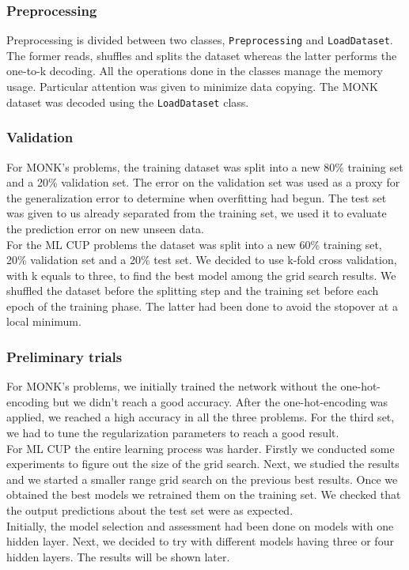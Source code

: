 \subsubsection{Preprocessing}
Preprocessing is divided between two classes, \texttt{Preprocessing} and \texttt{LoadDataset}. The former reads, shuffles and splits the dataset whereas the latter performs the one-to-k decoding. All the operations done in the classes manage the memory usage. Particular attention was given to minimize data copying. The MONK dataset was decoded using the \texttt{LoadDataset} class.

\subsubsection{Validation}
For MONK's problems, the training dataset was split into a new 80\% training set and a 20\% validation set. The error on the validation set was used as a proxy for the generalization error to determine when overfitting had begun. The test set was given to us already separated from the training set, we used it to evaluate the prediction error on new unseen data. 
\\
For the ML CUP problems the dataset was split into a new 60\% training set, 20\% validation set and a 20\% test set. We decided to use k-fold cross validation, with k equals to three, to find the best model among the grid search results. 
We shuffled the dataset before the splitting step and the training set before each epoch of the training phase. The latter had been done to avoid the stopover at a local minimum. 


\subsubsection{Preliminary trials}

For MONK's problems, we initially trained the network without the one-hot-encoding but we didn't reach a good accuracy. After the one-hot-encoding was applied, we reached a high accuracy in all the three problems. For the third set, we had to tune the regularization parameters to reach a good result.
\\
For ML CUP the entire learning process was harder. Firstly we conducted some experiments to figure out the size of the grid search. Next, we studied the results and we started a smaller range grid search on the previous best results. Once we obtained the best models we retrained them on the training set. We checked that the output predictions about the test set were as expected. 
\\
Initially, the model selection and assessment had been done on models with one hidden layer. Next, we decided to try with different models having three or four hidden layers. The results will be shown later.
